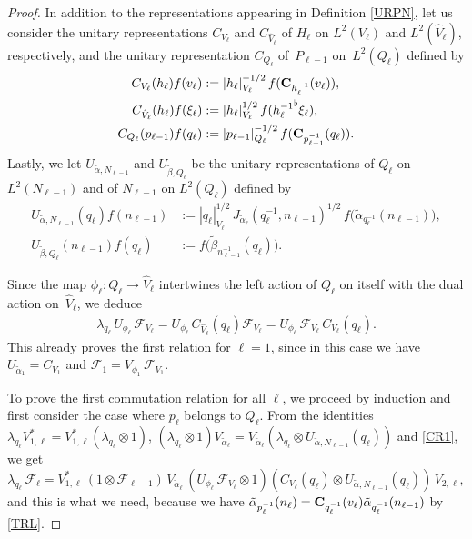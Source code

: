 \documentclass[a4paper,11pt,reqno]{amsart}
\numberwithin{equation}{section}
\theoremstyle{remark}
\theoremstyle{definition}
\newcommand{\F}{{\mathcal F}}
\newcommand{\CF}{\mathcal F}
\begin{document}
\begin{proof}
In addition to the representations appearing in Definition \ref{URPN}, let us consider the unitary representations $C_{V_\ell}$ and $C_{\hat V_\ell}$ of $H_\ell$ on
$L^2(V_\ell)$ and $L^2(\hat V_\ell)$, respectively, and the unitary representation $C_{Q_\ell}$ of~$P_{\ell-1}$ on~$L^2 (Q_\ell )$ defined by
\begin{align*}
C_{V_\ell}(h_\ell)f(v_\ell)&:=|h_\ell|_{V_\ell}^{-1/2}\,f({\bf C}_{h_\ell^{-1}}(v_\ell)),\\
C_{\hat V_\ell}(h_\ell)f(\xi_\ell)&:=|h_\ell|_{V_\ell}^{1/2}\,f({h_\ell^{-1}}^\flat\xi_\ell),\\
C_{Q_\ell}(p_{\ell-1})f(q_\ell)&:=|p_{\ell-1}|_{Q_\ell}^{-1/2}\,f({\bf C}_{p_{\ell-1}^{-1}}(q_\ell)).
\end{align*}
Lastly, we let $U_{\tilde\alpha,N_{\ell-1}}$ and $U_{\tilde\beta,Q_\ell}$ be the unitary representations of $Q_\ell$  on $L^2(N_{\ell-1})$  and  of $N_{\ell-1}$  on $L^2(Q_\ell )$ defined by
\begin{align*}
U_{\tilde\alpha,N_{\ell-1}}( q_\ell)f(n_{\ell-1})&:=|q_\ell|_{V_\ell}^{1/2}\,J_{\tilde\alpha_\ell}(q_\ell^{-1},n_{\ell-1})^{1/2}\, f\big(\tilde\alpha_{q_\ell^{-1}}(n_{\ell-1})\big),\\
U_{\tilde\beta,Q_\ell}(n_{\ell-1} )f(q_\ell)&:= f\big(\tilde\beta_{n_{\ell-1}^{-1}}(q_\ell)\big).
\end{align*}

Since the map $\phi_\ell:Q_\ell\to\hat V_\ell$ intertwines the left action of $Q_\ell$ on itself with the dual action on~$\hat V_\ell$,
 we deduce
 \begin{align}
 \label{CR1}
  \lambda_{q_\ell}\, U_{\phi_\ell}\,\F_{V_\ell}= U_{\phi_\ell}\,C_{\hat V_\ell}(q_\ell)\F_{V_\ell}= U_{\phi_\ell}\,\F_{V_\ell}\, C_{V_\ell}(q_\ell).
  \end{align}
This already proves the first relation for   $\ell=1$,  since in this case we have $U_{\tilde \alpha_1}=C_{V_1}$ and  $\CF_1=V_{\phi_1}\,\F_{V_1}$.

To prove the first commutation relation for all $\ell$, we proceed by induction and first consider the case where $p_\ell$ belongs to $Q_\ell$. From
the identities $ \lambda_{  q_\ell}V_{1,\ell}^*=V_{1,\ell}^*( \lambda_{q_\ell}\otimes 1)$, $( \lambda_{q_\ell}\otimes 1)  V_{\tilde\alpha_\ell} = V_{\tilde\alpha_\ell} (
  \lambda_{q_\ell}\otimes U_{\tilde\alpha,N_{\ell-1}}(q_\ell))$ and \eqref{CR1}, we get
 $$
 \lambda_{  q_\ell}\,\F_\ell=V_{1,\ell}^*\,(1\otimes \F_{\ell-1})\, V_{\tilde\alpha_\ell} \,
 (  U_{\phi_\ell}\,\F_{V_\ell}\otimes 1)(C_{V_\ell}(q_\ell)\otimes U_{\tilde\alpha,N_{\ell-1}}(q_\ell))\,V_{2,\ell},
$$
 and this is what we need,  because we have
$ \tilde\alpha_{ p_\ell^{-1}}(n_\ell)
={\bf C}_{ q_\ell^{-1}}(v_\ell)\tilde\alpha_{q_\ell^{-1}}(n_{\ell-1})$ by \eqref{TRL}.


\end{proof}
\end{document}
